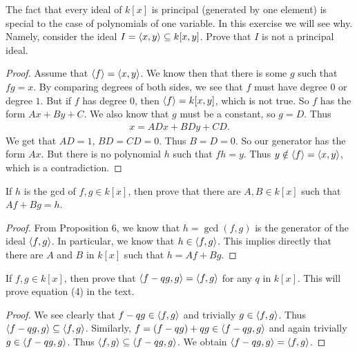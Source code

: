 \begin{exercise}{3}
The fact that every ideal of $k[x]$ is principal (generated by one element) is special to the case of polynomials of one variable. 
In this exercise we will see why. 
Namely, consider the ideal $I = \langle x,y\rangle\subseteq k[x,y]$. Prove that $I$ is not a principal ideal.
\end{exercise}
\begin{proof}
    Assume that $\langle f\rangle = \langle x,y\rangle$. 
    We know then that there is some $g$ such that $fg = x$. 
    By comparing degrees of both sides, we see that $f$ must have degree $0$ or degree $1$. 
    But if $f$ has degree $0$, then $\langle f\rangle = k[x,y]$, which is not true. 
    So $f$ has the form $Ax+By+C$. We also know that $g$ must be a constant, so $g = D$. 
    Thus
    \begin{align*}
        x = ADx + BDy + CD.
    \end{align*}
    We get that $AD = 1$, $BD = CD = 0$. 
    Thus $B=D = 0$. 
    So our generator has the form $Ax$. 
    But there is no polynomial $h$ such that $fh = y$. 
    Thus $y\notin \langle f\rangle = \langle x,y\rangle$, which is a contradiction.
\end{proof}

\begin{exercise}{4}
If $h$ is the gcd of $f,g\in k[x]$, then prove that there are $A,B\in k[x]$ such that $Af+Bg = h$.    
\end{exercise}
\begin{proof}
    From Proposition $6$, we know that $h=\gcd(f,g)$ is the generator of the ideal $\langle f,g\rangle$. 
    In particular, we know that $h\in \langle f,g\rangle$. 
    This implies directly that there are $A$ and $B$ in $k[x]$ such that $h=Af+Bg$.
\end{proof}

\begin{exercise}{5}
If $f,g\in k[x]$, then prove that $\langle f-qg, g\rangle = \langle f,g\rangle$ for any $q$ in $k[x]$. 
This will prove equation (4) in the text.
\end{exercise}
\begin{proof}
    We see clearly that $f-qg \in \langle f,g\rangle$ and trivially $g\in \langle f,g\rangle$. 
    Thus $\langle f-qg,g\rangle \subseteq \langle f,g\rangle$. 
    Similarly, $f = (f-qg) + qg\in \langle f-qg,g\rangle$ and again trivially $g\in \langle f-qg,g\rangle$. 
    Thus $\langle f,g\rangle\subseteq \langle f-qg,g\rangle$. 
    We obtain $\langle f-qg,g\rangle = \langle f,g\rangle$.
\end{proof}

